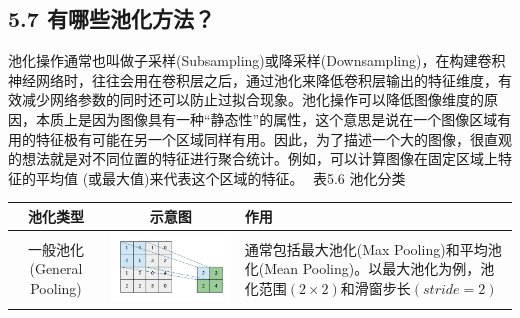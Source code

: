 \subsection{5.7
有哪些池化方法？}\label{ux6709ux54eaux4e9bux6c60ux5316ux65b9ux6cd5}

​
池化操作通常也叫做子采样(Subsampling)或降采样(Downsampling)，在构建卷积神经网络时，往往会用在卷积层之后，通过池化来降低卷积层输出的特征维度，有效减少网络参数的同时还可以防止过拟合现象。池化操作可以降低图像维度的原因，本质上是因为图像具有一种``静态性''的属性，这个意思是说在一个图像区域有用的特征极有可能在另一个区域同样有用。因此，为了描述一个大的图像，很直观的想法就是对不同位置的特征进行聚合统计。例如，可以计算图像在固定区域上特征的平均值
(或最大值)来代表这个区域的特征。 ​ 表5.6 池化分类

\begin{longtable}[]{@{}ccl@{}}
\toprule
\begin{minipage}[b]{0.26\columnwidth}\centering\strut
池化类型\strut
\end{minipage} & \begin{minipage}[b]{0.29\columnwidth}\centering\strut
示意图\strut
\end{minipage} & \begin{minipage}[b]{0.36\columnwidth}\raggedright\strut
作用\strut
\end{minipage}\tabularnewline
\midrule
\endhead
\begin{minipage}[t]{0.26\columnwidth}\centering\strut
一般池化(General Pooling)\strut
\end{minipage} & \begin{minipage}[t]{0.29\columnwidth}\centering\strut
\includegraphics{./img/ch5/general_pooling.png}\strut
\end{minipage} & \begin{minipage}[t]{0.36\columnwidth}\raggedright\strut
通常包括最大池化(Max Pooling)和平均池化(Mean
Pooling)。以最大池化为例，池化范围\((2\times2)\)和滑窗步长\((stride=2)\)

\end{minipage}
\end{longtable}
